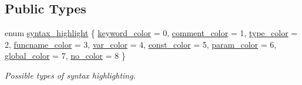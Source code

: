 \subsection*{Public Types}
\begin{DoxyCompactItemize}
\item 
enum \mbox{\hyperlink{class_emit_xml_a7c3577436da429c3c75f4b82cac6864f}{syntax\+\_\+highlight}} \{ \newline
\mbox{\hyperlink{class_emit_xml_a7c3577436da429c3c75f4b82cac6864fa2bde747902f274f4eb85e8f0f16f219a}{keyword\+\_\+color}} = 0, 
\mbox{\hyperlink{class_emit_xml_a7c3577436da429c3c75f4b82cac6864fac04070d280a6679640608c4432b2e66f}{comment\+\_\+color}} = 1, 
\mbox{\hyperlink{class_emit_xml_a7c3577436da429c3c75f4b82cac6864fad68de6337bd58ea2b4936cc8606980d1}{type\+\_\+color}} = 2, 
\mbox{\hyperlink{class_emit_xml_a7c3577436da429c3c75f4b82cac6864fab390f00b47c0466d368bde2307d800ee}{funcname\+\_\+color}} = 3, 
\newline
\mbox{\hyperlink{class_emit_xml_a7c3577436da429c3c75f4b82cac6864fab35f157a4c038dfa787fe263382f00bd}{var\+\_\+color}} = 4, 
\mbox{\hyperlink{class_emit_xml_a7c3577436da429c3c75f4b82cac6864fa965400cfc5eb0aa7195663af97257390}{const\+\_\+color}} = 5, 
\mbox{\hyperlink{class_emit_xml_a7c3577436da429c3c75f4b82cac6864fa6c7ab1ba75d07e714967713c32da67da}{param\+\_\+color}} = 6, 
\mbox{\hyperlink{class_emit_xml_a7c3577436da429c3c75f4b82cac6864fac690c5e430c8e1d8c965edd346a9139c}{global\+\_\+color}} = 7, 
\newline
\mbox{\hyperlink{class_emit_xml_a7c3577436da429c3c75f4b82cac6864facf637f33b975ebd31bda638a66d5b052}{no\+\_\+color}} = 8
 \}
\begin{DoxyCompactList}\small\item\em Possible types of syntax highlighting. \end{DoxyCompactList}\end{DoxyCompactItemize}
